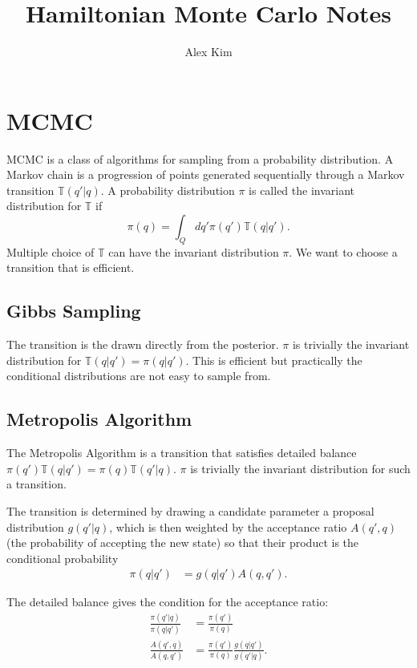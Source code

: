 \documentclass[11pt, oneside]{article}   	%
\title{Hamiltonian Monte Carlo Notes}
\author{Alex Kim}
\begin{document}
\maketitle



\section{MCMC}
MCMC is a  class of algorithms for sampling from a probability distribution.  
A Markov chain is a progression of points generated sequentially through a Markov transition $\mathbb{T}(q'|q)$.
A probability distribution $\pi$ is called the invariant distribution for $\mathbb{T}$ if
\begin{equation}
\pi(q) = \int_Q dq'  \pi(q') \mathbb{T}(q|q').
\label{condition:eqn}
\end{equation}
Multiple choice of $\mathbb{T}$ can have the invariant distribution $\pi$.  We want to choose
a transition that is efficient.


\subsection{Gibbs Sampling}
The transition is the drawn directly from the posterior.  $\pi$ is trivially the invariant distribution for
$\mathbb{T}(q|q') = \pi(q|q')$.
This is efficient but practically the conditional distributions are not easy to sample from.

\subsection{Metropolis Algorithm}
The Metropolis Algorithm is a transition that satisfies detailed balance
$\pi(q') \mathbb{T}(q|q') = \pi(q) \mathbb{T}(q'|q)$.
 $\pi$ is trivially the invariant distribution for such a transition.


The transition is determined by drawing a candidate
parameter  a proposal distribution $g(q'|q)$, which is then weighted by
the acceptance ratio $A(q',q)$ (the probability of accepting
the new state) so that their product is the conditional probability
\begin{align}
\pi(q|q')  &= g(q|q') A(q,q').
\end{align}

The detailed balance gives the condition for the acceptance ratio:
\begin{align}
\frac{\pi(q'|q)}{\pi(q|q')}&  = \frac{\pi(q')}{\pi(q)} \\
\frac{A(q',q)}{A(q,q')}&  = \frac{\pi(q')}{\pi(q)} \frac{g(q|q')}{g(q'|q)}.
\end{align}
\end{document}
